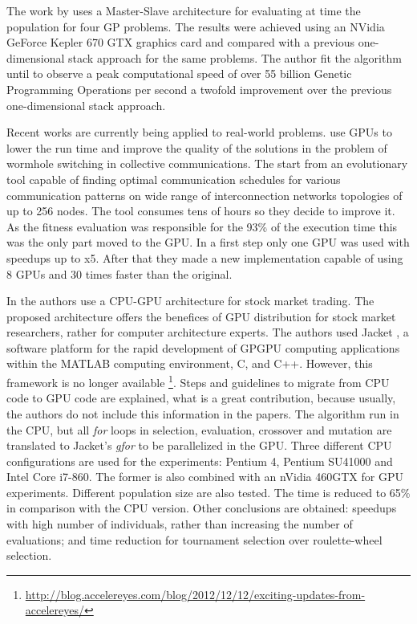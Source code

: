 \documentclass[Afour,sageh,times]{sagej}
\begin{document}
The work by \citep{Chitty16FastParallel} uses a Master-Slave architecture for evaluating at time the population for four GP problems. The results were achieved using an NVidia GeForce Kepler 670 GTX graphics card and compared with a previous one-dimensional stack approach for the same problems. The author fit the algorithm until to observe a peak computational speed of over 55 billion Genetic Programming Operations per second a twofold improvement over the previous one-dimensional stack approach.


Recent works are currently being applied to real-world problems. \cite{Jaros14Wormhole} use GPUs to lower the run time and improve the quality of the solutions in the problem of wormhole switching in collective communications. The start from an evolutionary tool capable of finding optimal communication schedules for various communication patterns on wide range of interconnection networks topologies of up to 256 nodes. The tool consumes tens of hours so they decide to improve it. As the fitness evaluation was responsible for the 93\% of the execution time this was the only part moved to the GPU. In a first step only one GPU was used with speedups up to x5. After that they made a new implementation capable of using 8 GPUs and 30 times faster than the original.

In \citep{Contreras:2012:UGA:2150467.2150469} the authors use a CPU-GPU architecture for stock market trading. The proposed architecture offers the benefices of GPU distribution for stock market researchers, rather for computer architecture experts. The authors used Jacket \citep{jacket:Matlab}, a software platform for the rapid development of GPGPU computing applications within the MATLAB computing environment, C, and C++. However, this framework is no longer available \footnote{\url{http://blog.accelereyes.com/blog/2012/12/12/exciting-updates-from-accelereyes/}}. Steps and guidelines to migrate from CPU code to GPU code are explained, what is a great contribution, because usually, the authors do not include this information in the papers. The algorithm run in the CPU, but all  {\em for} loops in selection, evaluation, crossover and mutation are translated to Jacket's {\em gfor} to be parallelized in the GPU. Three different CPU configurations are used for the experiments: Pentium 4, Pentium SU41000 and Intel Core i7-860. The former is also combined with an nVidia 460GTX for GPU experiments. Different population size are also tested. The time is reduced to 65\% in comparison with the CPU version. Other conclusions are obtained: speedups with high number of individuals, rather than increasing the number of evaluations; and time reduction for  tournament selection  over roulette-wheel selection.
\end{document}
